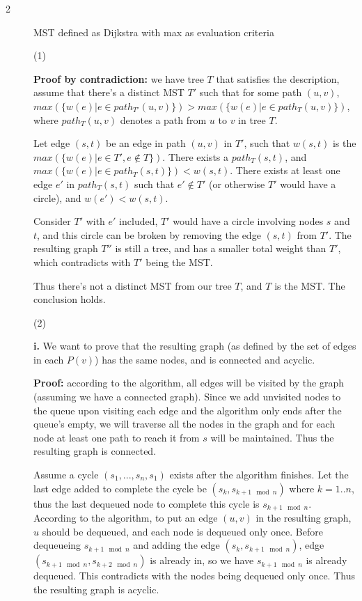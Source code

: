 \documentclass{article}
\begin{document}
\begin{description}
\item[2]{MST defined as Dijkstra with max as evaluation criteria}

  (1)

  \textbf{Proof by contradiction:} we have tree $T$ that satisfies the description, assume that there's a distinct MST $T'$ such that for some path $(u,v)$, $max(\{w(e) | e \in path_{T'}(u,v)\}) > max(\{w(e) | e \in path_{T}(u,v)\})$, where $path_{T}(u,v)$ denotes a path from $u$ to $v$ in tree $T$.

  Let edge $(s,t)$ be an edge in path $(u,v)$ in $T'$, such that $w(s,t)$ is the $max(\{w(e) | e \in T', e \notin T\})$. There exists a $path_{T}(s,t)$, and $max(\{w(e) | e \in path_{T}(s,t)\}) < w(s,t)$. There exists at least one edge $e'$ in $path_{T}(s,t)$ such that $e' \notin T'$ (or otherwise $T'$ would have a circle), and $w(e') < w(s,t)$. 

  Consider $T'$ with $e'$ included, $T'$ would have a circle involving nodes $s$ and $t$, and this circle can be broken by removing the edge $(s,t)$ from $T'$. The resulting graph $T''$ is still a tree, and has a smaller total weight than $T'$, which contradicts with $T'$ being the MST.

  Thus there's not a distinct MST from our tree $T$, and $T$ is the MST. The conclusion holds.

  (2)

  \textbf{i.} We want to prove that the resulting graph (as defined by the set of edges in each $P(v)$) has the same nodes, and is connected and acyclic.

  \textbf{Proof:} according to the algorithm, all edges will be visited by the graph (assuming we have a connected graph). Since we add unvisited nodes to the queue upon visiting each edge and the algorithm only ends after the queue's empty, we will traverse all the nodes in the graph and for each node at least one path to reach it from $s$ will be maintained. Thus the resulting graph is connected.

  Assume a cycle $(s_1,..., s_n, s_1)$ exists after the algorithm finishes. Let the last edge added to complete the cycle be $(s_k, s_{k+1 \mod n})$ where $k=1..n$, thus the last dequeued node to complete this cycle is $s_{k+1 \mod n}$. According to the algorithm, to put an edge $(u,v)$ in the resulting graph, $u$ should be dequeued, and each node is dequeued only once. Before dequeueing $s_{k+1 \mod n}$ and adding the edge $(s_k, s_{k+1 \mod n})$, edge $(s_{k+1 \mod n}, s_{k+2 \mod n})$ is already in, so we have $s_{k+1 \mod n}$ is already dequeued. This contradicts with the nodes being dequeued only once. Thus the resulting graph is acyclic.


\end{description}
\end{document}
